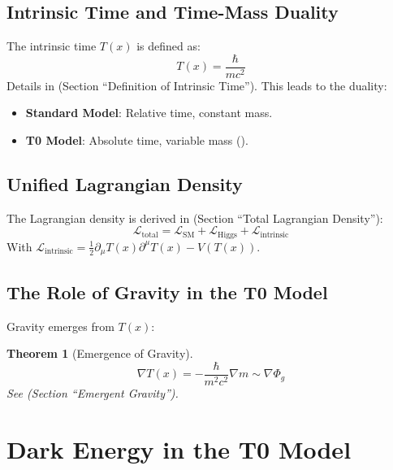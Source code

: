 \documentclass[a4paper,12pt]{article}
\newtheorem{theorem}{Theorem}[section]
\theoremstyle{definition}
\theoremstyle{remark}
\newcommand{\Tfield}{T(x)}
\begin{document}
	\subsection{Intrinsic Time and Time-Mass Duality}
	
	The intrinsic time \(\Tfield\) is defined as:
	\begin{equation}
		\Tfield = \frac{\hbar}{m c^2}
	\end{equation}
	Details in \cite{pascher_params_2025} (Section “Definition of Intrinsic Time”). This leads to the duality:
	\begin{itemize}
		\item \textbf{Standard Model}: Relative time, constant mass.
		\item \textbf{T0 Model}: Absolute time, variable mass (\cite{pascher_params_2025}).
	\end{itemize}
	
	\subsection{Unified Lagrangian Density}
	
	The Lagrangian density is derived in \cite{pascher_lagrange_2025} (Section “Total Lagrangian Density”):
	\begin{equation}
		\mathcal{L}_\text{total} = \mathcal{L}_\text{SM} + \mathcal{L}_\text{Higgs} + \mathcal{L}_\text{intrinsic}
	\end{equation}
	With \(\mathcal{L}_\text{intrinsic} = \frac{1}{2} \partial_\mu \Tfield \partial^\mu \Tfield - V(\Tfield)\).
	
	\subsection{The Role of Gravity in the T0 Model}
	
	Gravity emerges from \(\Tfield\):
	\begin{theorem}[Emergence of Gravity]
		\begin{equation}
			\nabla \Tfield = -\frac{\hbar}{m^2 c^2} \nabla m \sim \nabla \Phi_g
		\end{equation}
		See \cite{pascher_galaxies_2025} (Section “Emergent Gravity”).
	\end{theorem}
	
	\section{Dark Energy in the T0 Model}
	
\end{document}
